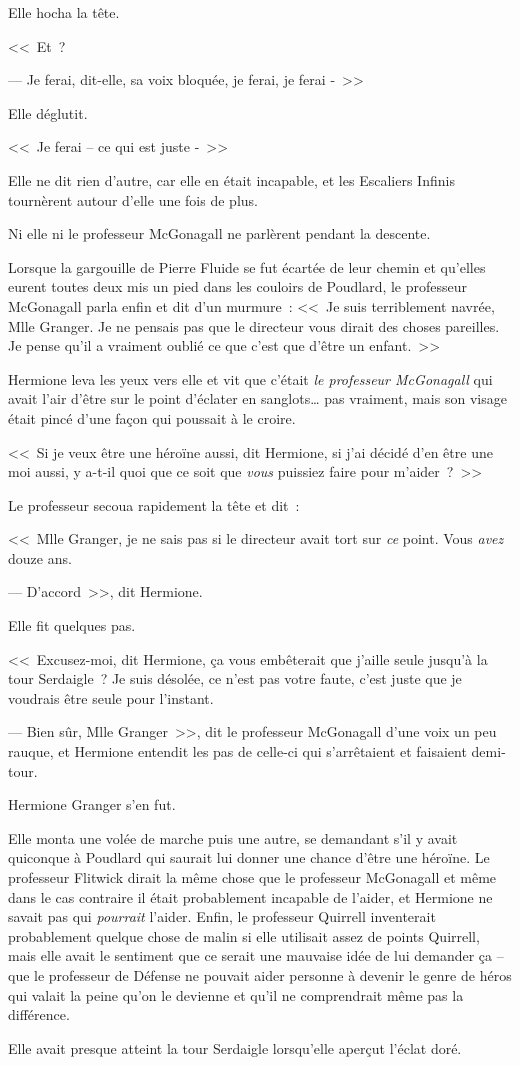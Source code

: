 Elle hocha la tête.

<<~Et~?

--- Je ferai, dit-elle, sa voix bloquée, je ferai, je ferai -~>>

Elle déglutit.

<<~Je ferai -- ce qui est juste -~>>

Elle ne dit rien d'autre, car elle en était incapable, et les Escaliers Infinis tournèrent autour d'elle une fois de plus.

Ni elle ni le professeur McGonagall ne parlèrent pendant la descente.

Lorsque la gargouille de Pierre Fluide se fut écartée de leur chemin et qu'elles eurent toutes deux mis un pied dans les couloirs de Poudlard, le professeur McGonagall parla enfin et dit d'un murmure~: <<~Je suis terriblement navrée, Mlle Granger. Je ne pensais pas que le directeur vous dirait des choses pareilles. Je pense qu'il a vraiment oublié ce que c'est que d'être un enfant.~>>

Hermione leva les yeux vers elle et vit que c'était \emph{le professeur McGonagall} qui avait l'air d'être sur le point d'éclater en sanglots… pas vraiment, mais son visage était pincé d'une façon qui poussait à le croire.

<<~Si je veux être une héroïne aussi, dit Hermione, si j'ai décidé d'en être une moi aussi, y a-t-il quoi que ce soit que \emph{vous} puissiez faire pour m'aider~?~>>

Le professeur secoua rapidement la tête et dit~:

<<~Mlle Granger, je ne sais pas si le directeur avait tort sur \emph{ce} point. Vous \emph{avez} douze ans.

--- D'accord~>>, dit Hermione.

Elle fit quelques pas.

<<~Excusez-moi, dit Hermione, ça vous embêterait que j'aille seule jusqu'à la tour Serdaigle~? Je suis désolée, ce n'est pas votre faute, c'est juste que je voudrais être seule pour l'instant.

--- Bien sûr, Mlle Granger~>>, dit le professeur McGonagall d'une voix un peu rauque, et Hermione entendit les pas de celle-ci qui s'arrêtaient et faisaient demi-tour.

Hermione Granger s'en fut.

Elle monta une volée de marche puis une autre, se demandant s'il y avait quiconque à Poudlard qui saurait lui donner une chance d'être une héroïne. Le professeur Flitwick dirait la même chose que le professeur McGonagall et même dans le cas contraire il était probablement incapable de l'aider, et Hermione ne savait pas qui \emph{pourrait} l'aider. Enfin, le professeur Quirrell inventerait probablement quelque chose de malin si elle utilisait assez de points Quirrell, mais elle avait le sentiment que ce serait une mauvaise idée de lui demander ça -- que le professeur de Défense ne pouvait aider personne à devenir le genre de héros qui valait la peine qu'on le devienne et qu'il ne comprendrait même pas la différence.

Elle avait presque atteint la tour Serdaigle lorsqu'elle aperçut l'éclat doré.
